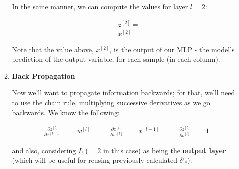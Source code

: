 \documentclass[12pt]{article}
\begin{document}
\begin{enumerate}[leftmargin=\labelsep]
\begin{enumerate}
                In the same manner, we can compute the values for layer $l = 2$:

                \begin{equation*}
                  \begin{aligned}
                     & z^{[2]} =  \\
                     & x^{[2]} = 
                  \end{aligned}
                \end{equation*}

                Note that the value above, $x^{[2]}$, is the output of our MLP - the model's
                prediction of the output variable, for each sample (in each column).

                \pagebreak

          \item \textbf{Back Propagation}

                Now we'll want to propagate information backwards; for that, we'll need to use
                the chain rule, multiplying successive derivatives as we go backwards.
                We know the following:

                \begin{equation*}
                  \begin{aligned}
                    \frac{\partial z^{[l]}}{\partial x^{[l - 1]}} & = w^{[l]}     & \qquad
                    \frac{\partial z^{[l]}}{\partial w^{[l]}}     & = x^{[l - 1]} & \qquad
                    \frac{\partial z^{[l]}}{\partial b^{[l]}}     & = 1
                  \end{aligned}
                \end{equation*}

                \vskip 0.5cm

                and also, considering $L$ ($=2$ in this case) as being the \textbf{output layer} (which will be useful for reusing previously calculated $\delta$'s):


\end{enumerate}
\end{enumerate}
\end{document}
